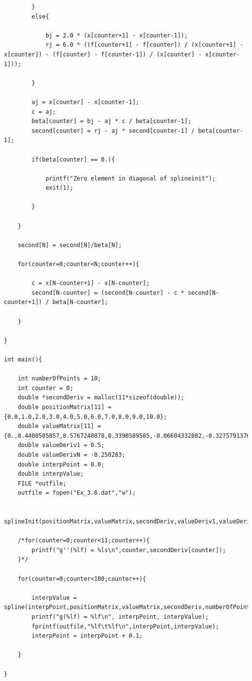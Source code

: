 \documentclass[12pt]{article}
\begin{document}
\begin{verbatim}
		}
		else{
			
			bj = 2.0 * (x[counter+1] - x[counter-1]);
			rj = 6.0 * ((f[counter+1] - f[counter]) / (x[counter+1] - x[counter]) - (f[counter] - f[counter-1]) / (x[counter] - x[counter-1]));

		}

		aj = x[counter] - x[counter-1];
		c = aj;
		beta[counter] = bj - aj * c / beta[counter-1];
		second[counter] = rj - aj * second[counter-1] / beta[counter-1];

		if(beta[counter] == 0.){
	
			printf("Zero element in diagonal of splineinit");
			exit(1);

		}

	}

	second[N] = second[N]/beta[N];

	for(counter=0;counter<N;counter++){

		c = x[N-counter+1] - x[N-counter];
		second[N-counter] = (second[N-counter] - c * second[N-counter+1]) / beta[N-counter];

	}

}

int main(){

	int numberOfPoints = 10;
	int counter = 0;
	double *secondDeriv = malloc(11*sizeof(double));
	double positionMatrix[11] = {0.0,1.0,2.0,3.0,4.0,5.0,6.0,7.0,8.0,9.0,10.0};
	double valueMatrix[11] = {0.,0.4400505857,0.5767248078,0.3390589585,-0.06604332802,-0.3275791376,-0.2766838581,-0.0046828235,0.2346363469,0.2453117866,0.04347274617};
	double valueDeriv1 = 0.5;
	double valueDerivN = -0.250283;
	double interpPoint = 0.0;
	double interpValue;
	FILE *outfile;
	outfile = fopen("Ex_3.6.dat","w");
	
	splineInit(positionMatrix,valueMatrix,secondDeriv,valueDeriv1,valueDerivN,numberOfPoints);

	/*for(counter=0;counter<11;counter++){
		printf("g''(%lf) = %ls\n",counter,secondDeriv[counter]);
	}*/

	for(counter=0;counter<100;counter++){

		interpValue = spline(interpPoint,positionMatrix,valueMatrix,secondDeriv,numberOfPoints);
		printf("g(%lf) = %lf\n", interpPoint, interpValue);
		fprintf(outfile,"%lf\t%lf\n",interpPoint,interpValue);
		interpPoint = interpPoint + 0.1;

	}

}
\end{verbatim}
\end{document}
